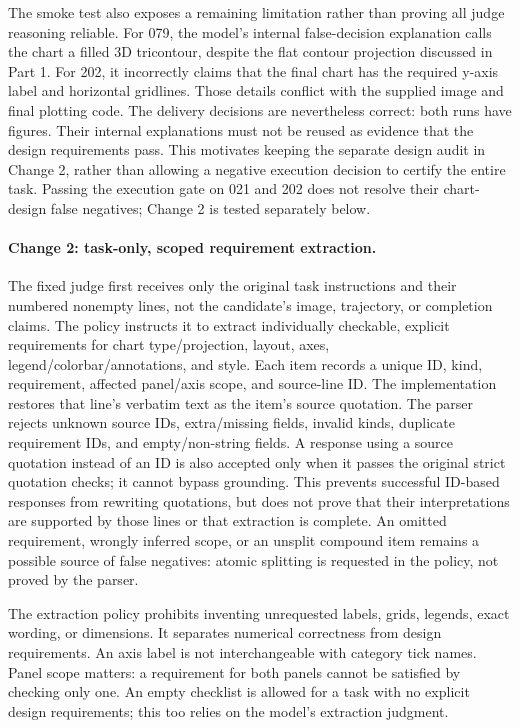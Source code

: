 \documentclass[11pt]{article}
\begin{document}
The smoke test also exposes a remaining limitation rather than proving all
judge reasoning reliable. For 079, the model's internal false-decision
explanation calls the chart a filled 3D tricontour, despite the flat contour
projection discussed in Part 1. For 202, it incorrectly claims that the final
chart has the required y-axis label and horizontal gridlines.
Those details conflict with the supplied image and final plotting code.
The delivery decisions are nevertheless correct: both runs have figures.
Their internal explanations must not be reused as evidence that the design
requirements pass. This motivates keeping the separate design audit in
Change 2, rather than allowing a negative execution decision to certify
the entire task. Passing the execution gate on 021 and 202 does not resolve
their chart-design false negatives; Change 2 is tested separately below.

\paragraph{Change 2: task-only, scoped requirement extraction.}
The fixed judge first receives only the original task instructions and their
numbered nonempty lines, not the candidate's image, trajectory, or completion
claims. The policy instructs it to extract individually checkable, explicit
requirements for chart type/projection, layout, axes,
legend/colorbar/annotations, and style. Each item records a unique ID, kind,
requirement, affected panel/axis scope, and source-line ID. The implementation
restores that line's verbatim text as the item's source quotation.
The parser rejects unknown source IDs, extra/missing fields, invalid kinds,
duplicate requirement IDs, and empty/non-string fields. A response using a
source quotation instead of an ID is also accepted only when it passes the
original strict quotation checks; it cannot bypass grounding.
This prevents successful ID-based responses from rewriting quotations, but
does not prove that their interpretations are supported by those lines or
that extraction is complete. An omitted requirement, wrongly inferred scope,
or an unsplit compound item remains a possible source of false negatives:
atomic splitting is requested in the policy, not proved by the parser.

The extraction policy prohibits inventing unrequested labels, grids, legends,
exact wording, or dimensions. It separates numerical correctness from design
requirements. An axis label is not interchangeable with category tick names.
Panel scope matters: a requirement for both panels cannot be satisfied by
checking only one. An empty checklist is allowed for a task with no explicit
design requirements; this too relies on the model's extraction judgment.
\end{document}
